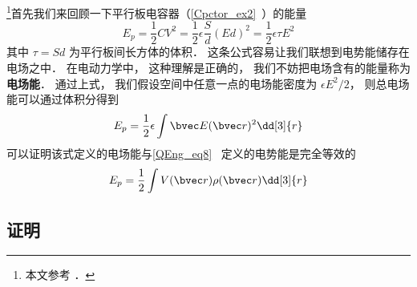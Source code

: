 
\begin{issues}
\issueDraft
\end{issues}


\footnote{本文参考 \cite{GriffE}．}首先我们来回顾一下平行板电容器（\autoref{Cpctor_ex2}~）的能量
\begin{equation}
E_p = \frac12 CV^2 = \frac12 \epsilon \frac Sd (Ed)^2 = \frac 12 \epsilon \tau E^2
\end{equation}
其中 $\tau = Sd$ 为平行板间长方体的体积． 这条公式容易让我们联想到电势能储存在电场之中． 在电动力学中， 这种理解是正确的， 我们不妨把电场含有的能量称为\textbf{电场能}． 通过上式， 我们假设空间中任意一点的电场能密度为 $\epsilon E^2/2$， 则总电场能可以通过体积分得到
\begin{equation}
E_p = \frac12 \epsilon \int \bvec E(\bvec r)^2 \dd[3]{r}
\end{equation}
可以证明该式定义的电场能与\autoref{QEng_eq8}~ 定义的电势能是完全等效的
\begin{equation}
E_p = \frac 12 \int V(\bvec r) \rho(\bvec r) \dd[3]{r}
\end{equation}


\subsection{证明}
